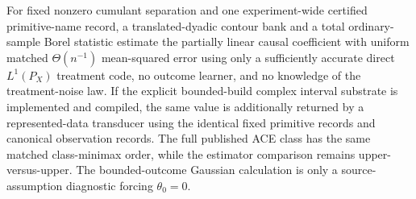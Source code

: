 For fixed nonzero cumulant separation and one experiment-wide certified primitive-name record, a translated-dyadic contour bank and a total ordinary-sample Borel statistic estimate the partially linear causal coefficient with uniform matched \(\Theta(n^{-1})\) mean-squared error using only a sufficiently accurate direct \(L^1(P_X)\) treatment code, no outcome learner, and no knowledge of the treatment-noise law. If the explicit bounded-build complex interval substrate is implemented and compiled, the same value is additionally returned by a represented-data transducer using the identical fixed primitive records and canonical observation records. The full published ACE class has the same matched class-minimax order, while the estimator comparison remains upper-versus-upper. The bounded-outcome Gaussian calculation is only a source-assumption diagnostic forcing \(\theta_0=0\).